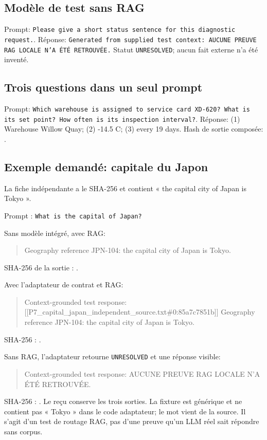 \documentclass[11pt,a4paper]{article}
\begin{document}
\subsection{Modèle de test sans RAG}
Prompt: \texttt{Please give a short status sentence for this diagnostic request.}. Réponse: \texttt{Generated from supplied test context: AUCUNE PREUVE RAG LOCALE N'A ÉTÉ RETROUVÉE.} Statut \texttt{UNRESOLVED}; aucun fait externe n'a été inventé.

\subsection{Trois questions dans un seul prompt}
Prompt: \texttt{Which warehouse is assigned to service card XD-620? What is its set point? How often is its inspection interval?}. Réponse: (1) Warehouse Willow Quay; (2) -14.5 C; (3) every 19 days. Hash de sortie composée: .

\subsection{Exemple demandé: capitale du Japon}
La fiche indépendante  a le SHA-256  et contient « the capital city of Japan is Tokyo ».

Prompt : \texttt{What is the capital of Japan?}

Sans modèle intégré, avec RAG:
\begin{quote}\ttfamily\small
Geography reference JPN-104: the capital city of Japan is Tokyo.
\end{quote}
SHA-256 de la sortie : .

Avec l'adaptateur de contrat et RAG:
\begin{quote}\ttfamily\small\raggedright
Context-grounded test response: [[P7\_capital\_japan\_independent\_source.txt\#0:85a7c7851b]] Geography reference JPN-104: the capital city of Japan is Tokyo.
\end{quote}
SHA-256 : .

Sans RAG, l'adaptateur retourne \texttt{UNRESOLVED} et une réponse visible:
\begin{quote}\ttfamily\small
Context-grounded test response: AUCUNE PREUVE RAG LOCALE N'A ÉTÉ RETROUVÉE.
\end{quote}
SHA-256 : . Le reçu  conserve les trois sorties. La fixture est générique et ne contient pas « Tokyo » dans le code adaptateur; le mot vient de la source. Il s'agit d'un test de routage RAG, pas d'une preuve qu'un LLM réel sait répondre sans corpus.
\end{document}
